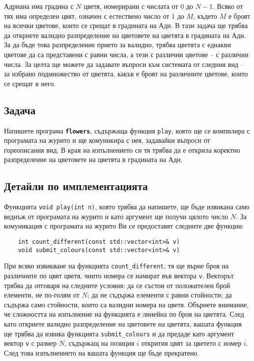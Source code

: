\documentclass[12pt]{article}
\begin{document}
\renewcommand{\tl}{$0{,}1$ сек.}
\renewcommand{\ml}{$256$ MB}
\renewcommand{\header}{
	XLII НАЦИОНАЛНА ОЛИМПИАДА ПО ИНФОРМАТИКА\\
	Областен кръг, 14 февруари 2026 г.\\
	Група A – 11, 12 клас
}

Адриана има градина с $N$ цветя, номерирани с числата от $0$ до $N-1$. Всяко от тях има определен цвят, означен с естествено число от $1$ до $M$, където $M$ е броят на всички цветове, които се срещат в градината на Ади. В тази задача ще трябва да откриете валидно разпределение на цветовете на цветята в градината на Ади. За да бъде това разпределение прието за валидно, трябва цветята с еднакви цветове да са представени с равни числа, а тези с различни цветове – с различни числа. За целта ще можете да задавате въпроси към системата от следния вид – за избрано подмножество от цветята, какъв е броят на различните цветове, които се срещат в него.

\subsection{Задача}
Напишете програма \textbf{\texttt{flowers}}, съдържаща функция \texttt{play}, която ще се компилира с програмата на журито и ще комуникира с нея, задавайки въпроси от гореописания вид. В края на изпълнението си тя трябва да е открила коректно разпределение на цветовете на цветята в градината на Ади.

\subsection{Детайли по имплементацията}
Функцията \texttt{void play(int n)}, която трябва да напишете, ще бъде извикана само веднъж от програмата на журито и като аргумент ще получи цялото число $N$. За комуникация с програмата на журито Ви се предоставят следните две функции:

\begin{lstlisting}
    int count_different(const std::vector<int>& v)
    void submit_colours(const std::vector<int>& v)
\end{lstlisting}

При всяко извикване на функцията \texttt{count\_different}, тя ще върне броя на различните по цвят цветя, чиито номера се намират във вектора \texttt{v}. Векторът трябва да отговаря на следните условия: да се състои от положителен брой елементи, не по-голям от $N$; да не съдържа елементи с равни стойности; да съдържа само стойности, които са валидни номера на цветя. Обърнете внимание, че сложността на изпълнение на функцията е линейна по броя на цветята. След като откриете валидно разпределение на цветовете на цветята, вашата функция ще трябва да извика функцията \texttt{submit\_colours} и да предаде като аргумент вектор \texttt{v} с размер $N$, съдържащ на позиция $i$ открития цвят за цветето с номер $i$. След това изпълнението на вашата функция ще бъде прекратено.
\end{document}
